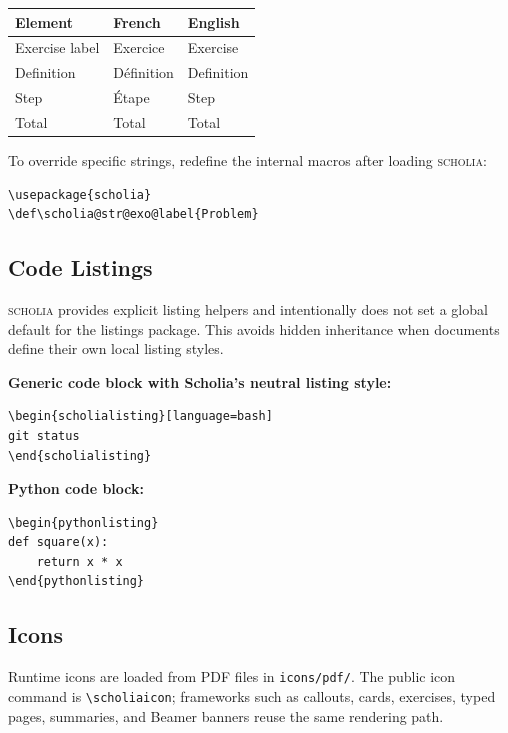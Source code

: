 \documentclass[11pt,a4paper]{article}
\newcommand{\pkg}[1]{\textsf{#1}\xspace}
\newcommand{\cmd}[1]{\texttt{\textbackslash#1}}
\newcommand{\scholia}{\textsc{scholia}\xspace}
\begin{document}
\begin{tabular}{@{}lll@{}}
\toprule
\textbf{Element} & \textbf{French} & \textbf{English} \\
\midrule
Exercise label & Exercice & Exercise \\
Definition & D\'efinition & Definition \\
Step & \'Etape & Step \\
Total & Total & Total \\
\bottomrule
\end{tabular}

\medskip
To override specific strings, redefine the internal macros after loading \scholia:

\begin{lstlisting}
\usepackage{scholia}
\def\scholia@str@exo@label{Problem}
\end{lstlisting}

\subsection{Code Listings}

\scholia provides explicit listing helpers and intentionally does not set a
global default for the \pkg{listings} package. This avoids hidden inheritance
when documents define their own local listing styles.

\textbf{Generic code block with Scholia's neutral listing style:}

\begin{lstlisting}
\begin{scholialisting}[language=bash]
git status
\end{scholialisting}
\end{lstlisting}

\textbf{Python code block:}

\begin{lstlisting}
\begin{pythonlisting}
def square(x):
    return x * x
\end{pythonlisting}
\end{lstlisting}

\subsection{Icons}

Runtime icons are loaded from PDF files in \texttt{icons/pdf/}. The public icon
command is \cmd{scholiaicon}; frameworks such as callouts, cards, exercises,
typed pages, summaries, and Beamer banners reuse the same rendering path.
\end{document}
